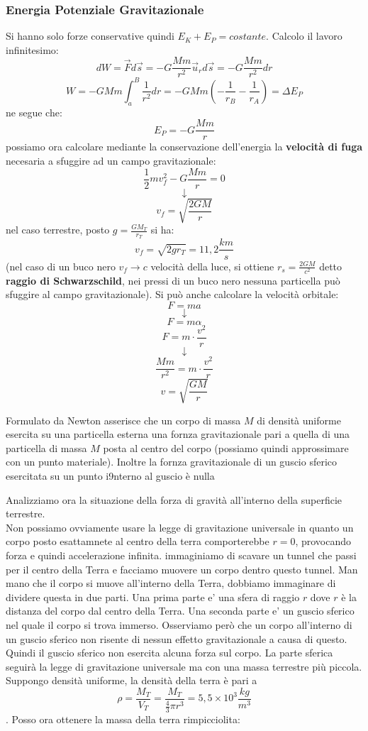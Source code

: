 \documentclass[a4paper,12pt, oneside]{book}
\begin{document}
\subsubsection{Energia Potenziale Gravitazionale}
Si hanno solo forze conservative quindi $E_K+E_P=costante$. Calcolo il lavoro infinitesimo:
$$dW=\vec{F}d\vec{s}=-G\frac{Mm}{r^2}\vec{u}_rd\vec{s}=-G\frac{Mm}{r^2}dr$$
$$W=-GMm\int_a^B\frac{1}{r^2}dr=-GMm\left(-\frac{1}{r_B}-\frac{1}{r_A}\right)=\Delta E_P$$
ne segue che:
$$E_P=-G\frac{Mm}{r}$$
possiamo ora calcolare mediante la conservazione dell'energia la \textbf{velocità di fuga} necesaria a sfuggire ad un campo gravitazionale:
$$\frac{1}{2}mv_f^2-G\frac{Mm}{r}=0$$
$$\downarrow$$
$$v_f=\sqrt{\frac{2GM}{r}}$$
nel caso terrestre, posto $g=\frac{G M_T}{r_T}$
si ha:
$$v_f=\sqrt{2gr_T}=11,2\frac{km}{s}$$
(nel caso di un buco nero $v_f\to c$ velocità della luce, si ottiene $r_s=\frac{2GM}{c^2}$ detto \textbf{raggio di Schwarzschild}, nei pressi di un buco nero nessuna particella può sfuggire al campo gravitazionale).
Si può anche calcolare la velocità orbitale:
$$F=ma$$
$$\downarrow$$
$$F=m\alpha$$
$$F=m\cdot \frac{v^2}{r}$$
$$\downarrow$$
$$\frac{Mm}{r^2}=m\cdot \frac{v^2}{r}$$
$$v=\sqrt{\frac{GM}{r}}$$
\begin{teorema}
Formulato da Newton asserisce che un corpo di massa $M$ di densità uniforme esercita su una particella esterna una fornza gravitazionale pari a quella di una particella di massa $M$ posta al centro del corpo (possiamo quindi approssimare con un punto materiale). Inoltre la fornza gravitazionale di un guscio sferico esercitata su un punto i9nterno al guscio è nulla
\end{teorema}
Analizziamo ora la situazione della forza di gravità all'interno della superficie terrestre.\\
Non possiamo ovviamente usare la legge di gravitazione universale in quanto un corpo posto esattamnete al centro della terra comporterebbe $r=0$, provocando forza e quindi accelerazione infinita. immaginiamo di scavare un tunnel che passi per il centro  della Terra e facciamo muovere un corpo dentro questo tunnel. Man mano  che il corpo si muove all'interno della Terra, dobbiamo immaginare di  dividere questa in due parti. Una prima parte e' una sfera di raggio $r$ dove $r$ è la distanza del corpo dal centro della Terra. Una seconda  parte  e' un guscio sferico nel quale il corpo si trova immerso. Osserviamo   però che un corpo all'interno di un  guscio sferico non risente di  nessun effetto gravitazionale a causa di questo. Quindi il guscio  sferico non esercita  alcuna forza sul corpo. La parte sferica seguirà la legge di gravitazione universale ma con una massa terrestre più piccola. Suppongo densità uniforme, la densità della terra è pari a $$\rho=\frac{M_T}{V_T}=\frac{M_T}{\frac{4}{3}\pi r^3}=5,5\times 10^3 \frac{kg}{m^3}$$. Posso ora ottenere la  massa della terra rimpicciolita:
\end{document}
